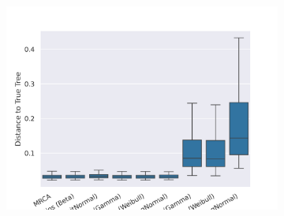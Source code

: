 \documentclass[10pt,letterpaper]{article}
\begin{document}
\begin{figure}[h!]
	\begin{subfigure}[b]{0.45\textwidth}
		\centering
		\includegraphics[width=\textwidth]{figures/yule-400-ccd1-point-estimates.png}
	\end{subfigure}
	
	\label{fig:accuracy-point-estimators}
\end{figure}
\end{document}
